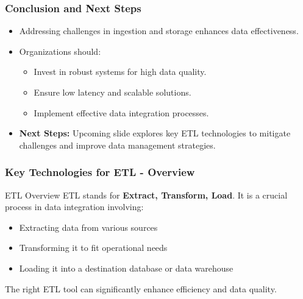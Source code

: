 \documentclass[aspectratio=169]{beamer}
\begin{document}
\begin{frame}[fragile]
    \frametitle{Conclusion and Next Steps}
    \begin{itemize}
        \item Addressing challenges in ingestion and storage enhances data effectiveness.
        \item Organizations should:
        \begin{itemize}
            \item Invest in robust systems for high data quality.
            \item Ensure low latency and scalable solutions.
            \item Implement effective data integration processes.
        \end{itemize}
        \item \textbf{Next Steps:} Upcoming slide explores key ETL technologies to mitigate challenges and improve data management strategies.
    \end{itemize}
\end{frame}

\begin{frame}[fragile]
    \frametitle{Key Technologies for ETL - Overview}
    \begin{block}{ETL Overview}
        ETL stands for \textbf{Extract, Transform, Load}. It is a crucial process in data integration involving:
        \begin{itemize}
            \item Extracting data from various sources
            \item Transforming it to fit operational needs
            \item Loading it into a destination database or data warehouse
        \end{itemize}
        The right ETL tool can significantly enhance efficiency and data quality.
    \end{block}
\end{frame}
\end{document}
